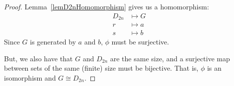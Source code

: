 \documentclass[../Main.tex]{subfiles}
\begin{document}
\begin{proof}
    Lemma~\ref{lemD2nHomomorphism} gives us a homomorphism:
    \begin{align*}
        D_{2n} &\mapsto G \\
        r &\mapsto a \\
        s &\mapsto b
    \end{align*}
    Since $G$ is generated by $a$ and $b$, $\phi$ must be surjective.\par
    But, we also have that $G$ and $D_{2n}$ are the same size, and a surjective map between sets of the same (finite) size must be bijective. That is, $\phi$ is an isomorphism and $G \cong D_{2n}$.
\end{proof}
\end{document}

